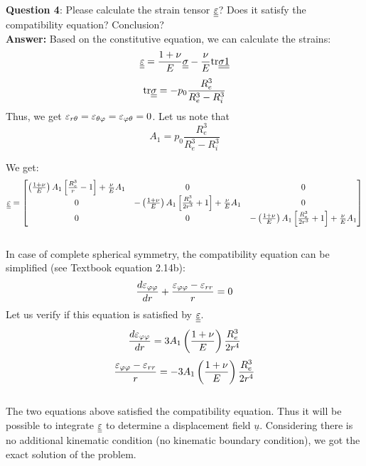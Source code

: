 \noindent \textbf{Question 4}: Please calculate the strain tensor $\underline{\underline{\varepsilon}}$? Does it satisfy the compatibility equation? Conclusion? \\

\textbf{Answer:} Based on the constitutive equation, we can calculate the strains:
\begin{equation}
\underline{\underline{\varepsilon}} = \frac{1+\nu}{E} \underline{\underline{\sigma}} - \frac{\nu}{E} \text{tr} \underline{\underline{\sigma}} \underline{\underline{1}}
\end{equation}
\begin{equation}
\text{tr}\underline{\underline{\sigma}} = -p_0 \frac{R_e^3}{R_e^3 - R_i^3}
\end{equation}
Thus, we get $\varepsilon_{r\theta} = \varepsilon_{\theta\varphi} = \varepsilon_{\varphi\theta} = 0$. Let us note that 
\begin{equation}
A_1 = p_0 \frac{R_e^3}{R_e^3 - R_i^3}
\end{equation}

We get:
\begin{equation}
\underline{\underline{\varepsilon}} =  \left[
\begin{matrix}
\left(\frac{1+\nu}{E}\right) A_1 \left[
\frac{R_e^3}{r} - 1 \right] + \frac{\nu}{E} A_1 & 0 & 0 \\
0 & -\left(\frac{1+\nu}{E}\right) A_1 \left[
\frac{R_e^3}{2r^3} + 1 \right] + \frac{\nu}{E} A_1 & 0 \\
0 & 0 & -\left(\frac{1+\nu}{E}\right) A_1 \left[
\frac{R_e^3}{2r^3} + 1 \right] + \frac{\nu}{E} A_1
\end{matrix}
\right]
\end{equation} \\

In case of complete spherical symmetry, the compatibility equation can be simplified (see Textbook equation 2.14b):
\begin{equation}
\frac{d\varepsilon_{\varphi\varphi}}{dr} + \frac{\varepsilon_{\varphi\varphi}- \varepsilon_{rr}}{r} = 0
\end{equation}
Let us verify if this equation is satisfied by $\underline{\underline{\varepsilon}}$.
\begin{equation}
\frac{d\varepsilon_{\varphi\varphi}}{dr} = 3A_1 \left(\frac{1+\nu}{E}\right) \frac{R_e^3}{2r^4}
\end{equation}
\begin{equation}
\frac{\varepsilon_{\varphi\varphi} - \varepsilon_{rr}}{r} = -3A_1 \left(\frac{1+\nu}{E}\right) \frac{R_e^3}{2r^4}
\end{equation} \\

The two equations above satisfied the compatibility equation. Thus it will be possible to integrate $\underline{\underline{\varepsilon}}$ to determine a displacement field $\underline{u}$. Considering there is no additional kinematic condition (no kinematic boundary condition), we got the exact solution of the problem.

